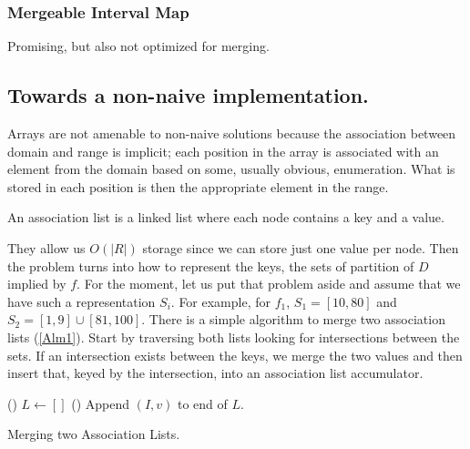 \documentclass{article}
\begin{document}
\subsubsection{Mergeable Interval Map}

Promising, but also not optimized for merging.

\subsection{Towards a non-naive implementation.}

Arrays are not amenable to non-naive solutions
because the association between domain and range is implicit;
each position in the array is associated with an element from the domain
based on some, usually obvious, enumeration.
What is stored in each position is then the appropriate element in the range.

An association list is a linked list where each node contains a key and a value.
\begin{comment}
For our purposes, they highlight how to separate two concerns necessary for
our representation.
\end{comment}
They allow us $O(|R|)$ storage since we can store just one value per node.
Then the problem turns into how to represent the keys,
the sets of partition of $D$ implied by $f$.
For the moment,
let us put that problem aside and assume that we have such a representation
$S_{i}$.
For example, for $f_{1}$, $S_{1} = [10,80]$ and $S_{2} = [1,9]\cup[81,100]$.
There is a simple algorithm to merge two association lists (\ref{Alm1}).
Start by traversing both lists looking for intersections between the sets.
If an intersection exists between the keys,
we merge the two values and then insert that,
keyed by the intersection,
into an association list accumulator.

\begin{algorithm}[H]
  \newcommand{\forcond}{$i=0$ \KwTo $n$}
  \DontPrintSemicolon
  \Fn(){}{
    $L \leftarrow [] $\;
  }
  \Fn(){}{
    Append $(I,v)$ to end of $L$.\;
  }
\caption{Merging two Association Lists.\label{Alm1}}
\end{algorithm}
\end{document}
